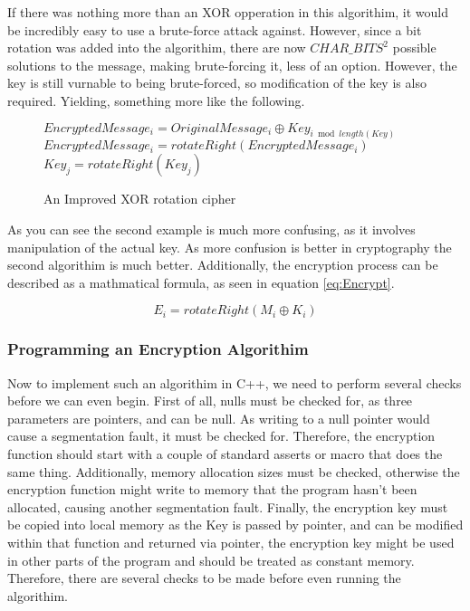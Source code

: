\documentclass[12pt]{article}
\begin{document}
    If there was nothing more than an XOR opperation in this algorithim,
    it would be incredibly easy to use a brute-force attack against.
    However, since a bit rotation was added into the algorithim, there
    are now \(CHAR\_BITS^2\) possible solutions to the message, making
    brute-forcing it, less of an option. However, the key is still
    vurnable to being brute-forced, so modification of the key is also
    required. Yielding, something more like the following.
    
    \begin{figure}[h]
    \begin{algorithmic}[1]
      \State $EncryptedMessage_i =
             OriginalMessage_i \oplus Key_{i \bmod length(Key)}$
      \State $EncryptedMessage_i = rotateRight(EncryptedMessage_i)$
          \State $Key_j = rotateRight(Key_j)$
        \EndFor
      \EndIf
    \EndFor
    \end{algorithmic}
    \caption{An Improved XOR rotation cipher}
    \end{figure}
    
    As you can see the second example is much more confusing, as it involves
    manipulation of the actual key. As more confusion is better in 
    cryptography the second algorithim is much better.
    Additionally, the encryption process can be described as a mathmatical
    formula, as seen in equation \eqref{eq:Encrypt}.
    
    \begin{equation}
      \label{eq:Encrypt}
      E_{i} = rotateRight(M_{i} \oplus K_{i})   
    \end{equation}

    \subsubsection{Programming an Encryption Algorithim}
    Now to implement such an algorithim in C++, we need to perform several
    checks before we can even begin. First of all, nulls must be
    checked for, as three parameters are pointers, and can be null. As writing
    to a null pointer would cause a segmentation fault, it must be checked for.
    Therefore, the encryption function should start with a couple of standard
    asserts or macro that does the same thing. Additionally, memory allocation
    sizes must be checked, otherwise the encryption function might write to
    memory that the program hasn't  been allocated, causing another
    segmentation fault. Finally, the encryption key must be copied into
    local memory as the Key is passed by pointer, and can be modified within
    that function and returned via pointer, the encryption key might be used
    in other parts of the program and should be treated as constant memory.
    Therefore, there are several checks to be made before even running the
    algorithim.
    
\end{document}
